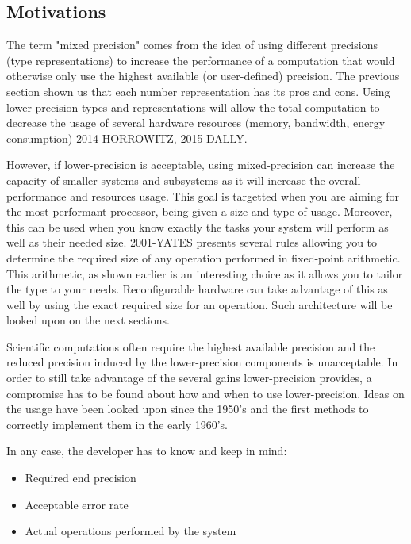 \subsection{Motivations}

The term "mixed precision" comes from the idea of using different precisions (type representations) to increase the performance of a computation that would otherwise only use the highest available (or user-defined) precision. The previous section shown us that each number representation has its pros and cons. Using lower precision types and representations will allow the total computation to decrease the usage of several hardware resources (memory, bandwidth, energy consumption) 2014-HORROWITZ, 2015-DALLY.

However, if lower-precision is acceptable, using mixed-precision can increase the capacity of smaller systems and subsystems as it will increase the overall performance and resources usage. This goal is targetted when you are aiming for the most performant processor, being given a size and type of usage. Moreover, this can be used when you know exactly the tasks your system will perform as well as their needed size. 2001-YATES presents several rules allowing you to determine the required size of any operation performed in fixed-point arithmetic. This arithmetic, as shown earlier is an interesting choice as it allows you to tailor the type to your needs. Reconfigurable hardware can take advantage of this as well by using the exact required size for an operation. Such architecture will be looked upon on the next sections.

Scientific computations often require the highest available precision and the reduced precision induced by the lower-precision components is unacceptable. In order to still take advantage of the several gains lower-precision provides, a compromise has to be found about how and when to use lower-precision. Ideas on the usage have been looked upon since the 1950's and the first methods to correctly implement them in the early 1960's.

In any case, the developer has to know and keep in mind:
\begin{itemize}
  \item Required end precision
  \item Acceptable error rate
  \item Actual operations performed by the system
\end{itemize}

